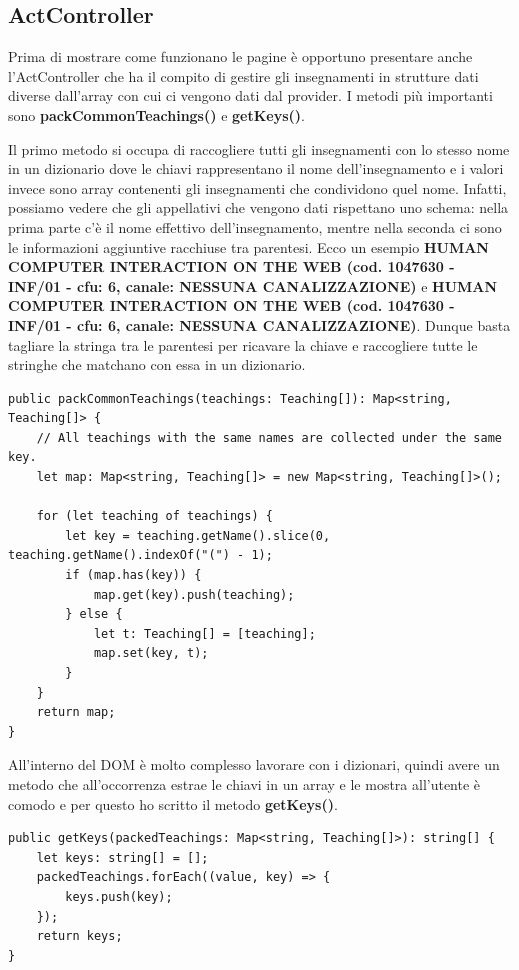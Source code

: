 \documentclass[Lau, oneside, noexaminfo]{sapthesis}%
\begin{document}
\subsection{ActController}
\label{sc:controller}
Prima di mostrare come funzionano le pagine è opportuno presentare anche l'ActController che ha il compito di gestire gli insegnamenti in strutture dati diverse dall'array con cui ci vengono dati dal provider. I metodi più importanti sono \textbf{packCommonTeachings()} e \textbf{getKeys()}.

Il primo metodo si occupa di raccogliere tutti gli insegnamenti con lo stesso nome in un dizionario dove le chiavi rappresentano il nome dell'insegnamento e i valori invece sono array contenenti gli insegnamenti che condividono quel nome. Infatti, possiamo vedere che gli appellativi che vengono dati rispettano uno schema: nella prima parte c'è il nome effettivo dell'insegnamento, mentre nella seconda ci sono le informazioni aggiuntive racchiuse tra parentesi. Ecco un esempio \textbf{HUMAN COMPUTER INTERACTION ON THE WEB (cod. 1047630 - INF/01 - cfu: 6, canale: NESSUNA CANALIZZAZIONE)} e \textbf{HUMAN COMPUTER INTERACTION ON THE WEB (cod. 1047630 - INF/01 - cfu: 6, canale: NESSUNA CANALIZZAZIONE)}. Dunque basta tagliare la stringa tra le parentesi per ricavare la chiave e raccogliere tutte le stringhe che matchano con essa in un dizionario.

\begin{lstlisting}
public packCommonTeachings(teachings: Teaching[]): Map<string, Teaching[]> {
	// All teachings with the same names are collected under the same key.
	let map: Map<string, Teaching[]> = new Map<string, Teaching[]>();

	for (let teaching of teachings) {
		let key = teaching.getName().slice(0, teaching.getName().indexOf("(") - 1);
		if (map.has(key)) {
			map.get(key).push(teaching);
		} else {
			let t: Teaching[] = [teaching];
			map.set(key, t);
		}
	}
	return map;
}
\end{lstlisting}

All'interno del DOM è molto complesso lavorare con i dizionari, quindi avere un metodo che all'occorrenza estrae le chiavi in un array e le mostra all'utente è comodo e per questo ho scritto il metodo \textbf{getKeys()}.

\begin{lstlisting}
public getKeys(packedTeachings: Map<string, Teaching[]>): string[] {
	let keys: string[] = [];
	packedTeachings.forEach((value, key) => {
		keys.push(key);
	});
	return keys;
}
\end{lstlisting}
\end{document}

